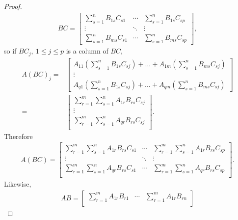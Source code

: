 \documentclass[12pt]{article}
\begin{document}
\begin{thm}
\begin{proof}
    \begin{align*}
      BC =
      \begin{bmatrix}
        \sum_{s = 1}^{n} B_{1s}C_{s1}
          & \cdots
          & \sum_{s = 1}^{n} B_{1s}C_{sp}\\
        \vdots
          & \ddots
          & \vdots\\
        \sum_{s = 1}^{n} B_{ms}C_{s1}
          & \cdots
          & \sum_{s = 1}^{n} B_{ms}C_{sp}
      \end{bmatrix},
    \end{align*}
    so if $BC_j,\ 1 \leq j \leq p$ is a column of $BC$,
    \begin{align*}
      A(BC)_j =&
      \begin{bmatrix}
        A_{11}(\sum_{s = 1}^{n} B_{1s}C_{sj})
          + \ldots
          + A_{1m}(\sum_{s = 1}^{n} B_{ms}C_{sj})\\
        \vdots\\
        A_{q1}(\sum_{s = 1}^{n} B_{1s}C_{sj})
          + \ldots
          + A_{qm}(\sum_{s = 1}^{n} B_{ms}C_{sj})
      \end{bmatrix}\\
      =&
      \begin{bmatrix}
        \sum_{r = 1}^{m}\sum_{s = 1}^{n} A_{1r}B_{rs}C_{sj}\\
        \vdots\\
        \sum_{r = 1}^{m}\sum_{s = 1}^{n} A_{qr}B_{rs}C_{sj}\\
      \end{bmatrix}.
    \end{align*}
    Therefore
    \begin{align*}
      A(BC) =
      \begin{bmatrix}
        \sum_{r = 1}^{m}\sum_{s = 1}^{n} A_{1r}B_{rs}C_{s1}
          & \cdots
          & \sum_{r = 1}^{m}\sum_{s = 1}^{n} A_{1r}B_{rs}C_{sp}\\
        \vdots & \ddots & \vdots\\
        \sum_{r = 1}^{m}\sum_{s = 1}^{n} A_{qr}B_{rs}C_{s1}
          & \cdots
          & \sum_{r = 1}^{m}\sum_{s = 1}^{n} A_{qr}B_{rs}C_{sp}\\
      \end{bmatrix}.
    \end{align*}
    Likewise,
    \begin{align*}
      AB =
      \begin{bmatrix}
        \sum_{r = 1}^{m} A_{1r}B_{r1}
          & \cdots
          & \sum_{r = 1}^{m} A_{1r}B_{rn}\\

\end{bmatrix}
\end{align*}
\end{proof}
\end{thm}
\end{document}
